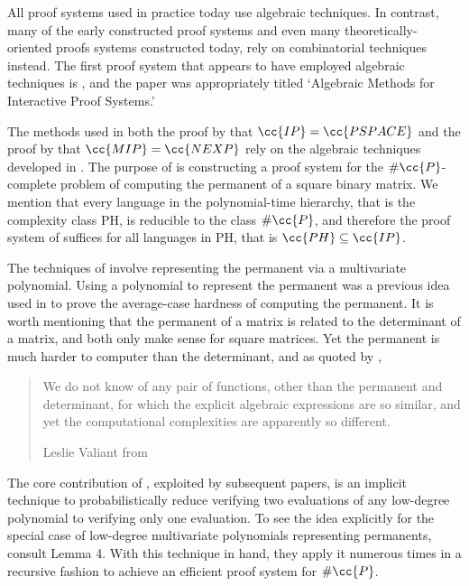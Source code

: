 
All proof systems used in practice today use algebraic techniques.
In contrast, many of the early constructed proof systems and even many theoretically-oriented proofs systems constructed today, rely on combinatorial techniques instead.
The first proof system that appears to have employed algebraic techniques is \cite{FKLN92}, and the paper was appropriately titled `Algebraic Methods for Interactive Proof Systems.'

The methods used in both the proof by \cite{Sha92} that $\cc{IP}=\cc{PSPACE}$ and the proof by \cite{BFL91} that $\cc{MIP}=\cc{NEXP}$ rely on the algebraic techniques developed in \cite{FKLN92}.
The purpose of \cite{FKLN92} is constructing a proof system for the $\#\cc{P}$-complete problem of computing the permanent of a square binary matrix.
We mention that every language in the polynomial-time hierarchy, that is the complexity class PH, is reducible to the class $\#\cc{P}$, and therefore the proof system of \cite{FKLN92} suffices for all languages in PH, that is $\cc{PH}\subseteq\cc{IP}$.

The techniques of \cite{FKLN92} involve representing the permanent via a multivariate polynomial.
Using a polynomial to represent the permanent was a previous idea used in \cite{Val79} to prove the average-case hardness of computing the permanent.
It is worth mentioning that the permanent of a matrix is related to the determinant of a matrix, and both only make sense for square matrices.
Yet the permanent is much harder to computer than the determinant, and as quoted by \cite{Val79},
\begin{quote}
    We do not know of any pair of functions, other than the permanent and determinant, for which the explicit algebraic expressions are so similar, and yet the computational complexities are apparently so different.
    
    Leslie Valiant from \cite{Val79}
\end{quote}

The core contribution of \cite{FKLN92}, exploited by subsequent papers, is an implicit technique to probabilistically reduce verifying two evaluations of any low-degree polynomial to verifying only one evaluation.
To see the idea explicitly for the special case of low-degree multivariate polynomials representing permanents, consult \cite{FKLN92} Lemma 4.
With this technique in hand, they apply it numerous times in a recursive fashion to achieve an efficient proof system for $\#\cc{P}$.

